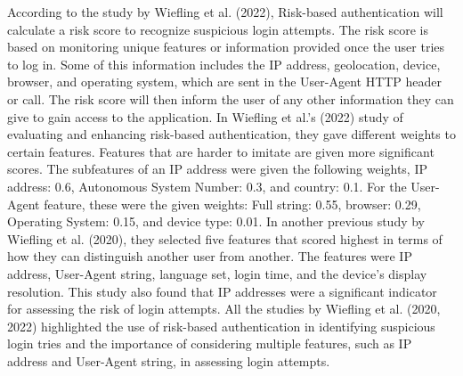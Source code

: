 \documentclass{icsthesis}
\begin{document}
\begin{mainmatter}
\indent According to the study by Wiefling et al. (2022), Risk-based authentication will calculate a risk score to recognize suspicious login attempts. The risk score is based on monitoring unique features or information provided once the user tries to log in. Some of this information includes the IP address, geolocation, device, browser, and operating system, which are sent in the User-Agent HTTP header or call. The risk score will then inform the user of any other information they can give to gain access to the application. In Wiefling et al.'s (2022) study of evaluating and enhancing risk-based authentication, they gave different weights to certain features. Features that are harder to imitate are given more significant scores. The subfeatures of an IP address were given the following weights, IP address: 0.6, Autonomous System Number: 0.3, and country: 0.1. For the User-Agent feature, these were the given weights: Full string: 0.55, browser: 0.29, Operating System: 0.15, and device type: 0.01. In another previous study by Wiefling et al. (2020), they selected five features that scored highest in terms of how they can distinguish another user from another. The features were IP address, User-Agent string, language set, login time, and the device's display resolution. This study also found that IP addresses were a significant indicator for assessing the risk of login attempts. All the studies by Wiefling et al. (2020, 2022) highlighted the use of risk-based authentication in identifying suspicious login tries and the importance of considering multiple features, such as IP address and User-Agent string, in assessing login attempts.\\

\end{mainmatter}
\end{document}
